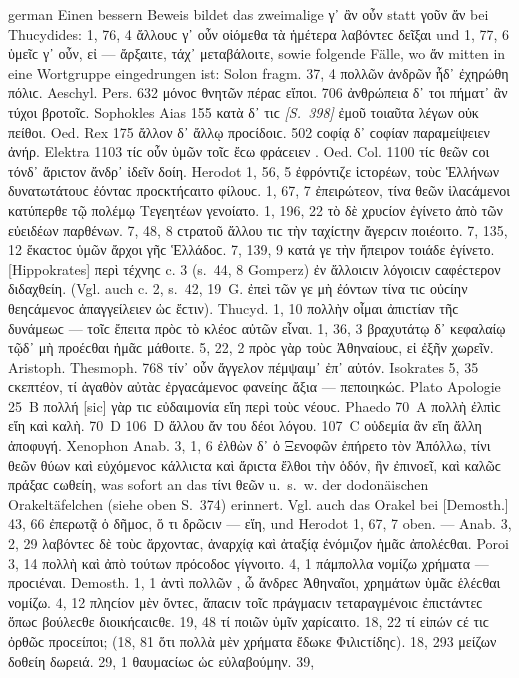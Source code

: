 \begin{otherlanguage*}{german}
Einen bessern Beweis bildet das zweimalige γ᾽ ἂν οὖν statt γοῦν ἄν bei Thucydides: 1, 76, 4 ἄλλουϲ γ᾽  οὖν οἰόμεθα τὰ ἡμέτερα λαβόντεϲ δεῖξαι  und 1, 77, 6 ὑμεῖϲ γ᾽  οὖν, εἰ — ἄρξαιτε, τάχ᾽  μεταβάλοιτε, sowie folgende Fälle, wo ἄν mitten in eine Wortgruppe eingedrungen ist: Solon fragm. 37, 4 πολλῶν  ἀνδρῶν ἧδ᾽ ἐχηρώθη πόλιϲ. Aeschyl. Pers. 632 μόνοϲ  θνητῶν πέραϲ εἴποι. 706 ἀνθρώπεια δ᾽  τοι πήματ᾽ ἂν τύχοι βροτοῖϲ. Sophokles Aias 155 κατὰ δ᾽  τιϲ \hypertarget{p398}{\emph{[S.~398]}}\label{p398} ἐμοῦ τοιαῦτα λέγων οὐκ  πείθοι. Oed. Rex 175 ἄλλον δ᾽  ἄλλῳ προϲίδοιϲ. 502 ϲοφίᾳ δ᾽  ϲοφίαν παραμείψειεν ἀνήρ. Elektra 1103 τίϲ οὖν  ὑμῶν τοῖϲ ἔϲω φράϲειεν . Oed. Col. 1100 τίϲ  θεῶν ϲοι τόνδ᾽ ἄριϲτον ἄνδρ᾽ ἰδεῖν δοίη. Herodot 1, 56, 5 ἐφρόντιζε ἱϲτορέων, τοὺϲ  Ἑλλήνων δυνατωτάτουϲ ἐόνταϲ προϲκτήϲαιτο φίλουϲ. 1, 67, 7 ἐπειρώτεον, τίνα  θεῶν ἱλαϲάμενοι κατύπερθε τῷ πολέμῳ Τεγεητέων γενοίατο. 1, 196, 22 τὸ δὲ  χρυϲίον ἐγίνετο ἀπὸ τῶν εὐειδέων παρθένων. 7, 48, 8 ϲτρατοῦ  ἄλλου τιϲ τὴν ταχίϲτην ἄγερϲιν ποιέοιτο. 7, 135, 12 ἕκαϲτοϲ  ὑμῶν ἄρχοι γῆϲ Ἑλλάδοϲ. 7, 139, 9 κατά γε  τὴν ἤπειρον τοιάδε ἐγίνετο. [Hippokrates] περὶ τέχνηϲ c. 3 (s.~44, 8 Gomperz) ἐν ἄλλοιϲιν  λόγοιϲιν ϲαφέϲτερον διδαχθείη. (Vgl. auch c. 2, s.~42, 19~G. ἐπεὶ τῶν γε μὴ ἐόντων τίνα  τιϲ οὐϲίην θεηϲάμενοϲ ἀπαγγείλειεν ὡϲ ἔϲτιν). Thucyd. 1, 10 πολλὴν  οἶμαι ἀπιϲτίαν τῆϲ δυνάμεωϲ — τοῖϲ ἔπειτα πρὸϲ τὸ κλέοϲ αὐτῶν εἶναι. 1, 36, 3 βραχυτάτῳ δ᾽  κεφαλαίῳ τῷδ᾽  μὴ προέϲθαι ἡμᾶϲ μάθοιτε. 5, 22, 2 πρὸϲ γὰρ  τοὺϲ Ἀθηναίουϲ, εἰ ἐξῆν χωρεῖν. Aristoph. Thesmoph. 768 τίν᾽ οὖν  ἄγγελον πέμψαιμ᾽ ἐπ᾽ αὐτόν. Isokrates 5, 35 ϲκεπτέον, τί  ἀγαθὸν αὐτὰϲ ἐργαϲάμενοϲ φανείηϲ ἄξια — πεποιηκώϲ. Plato Apologie 25~B πολλή [sic] γὰρ  τιϲ εὐδαιμονία εἴη περὶ τοὺϲ νέουϲ. Phaedo 70~Α πολλὴ  ἐλπὶϲ εἴη καὶ καλὴ. 70~D 106~D ἄλλου {ἄν} του δέοι λόγου. 107~C οὐδεμία {ἂν} εἴη ἄλλη ἀποφυγή. Xenophon Anab. 3, 1, 6 ἐλθὼν δ᾽ ὁ Ξενοφῶν ἐπήρετο τὸν Ἀπόλλω, τίνι  θεῶν θύων καὶ εὐχόμενοϲ κάλλιϲτα καὶ ἄριϲτα ἔλθοι τὴν ὁδόν, ἣν ἐπινοεῖ, καὶ καλῶϲ πράξαϲ ϲωθείη, was sofort an das τίνι  θεῶν u.~s.~w. der dodonäischen Orakeltäfelchen (siehe oben S.~374) erinnert. Vgl. auch das Orakel bei [Demosth.] 43, 66 ἐπερωτᾷ ὁ δῆμοϲ, ὅ τι  δρῶϲιν — εἵη, und Herodot 1, 67, 7 oben. — Anab. 3, 2, 29 λαβόντεϲ δὲ τοὺϲ ἄρχονταϲ, ἀναρχίᾳ  καὶ ἀταξίᾳ ἐνόμιζον ἡμᾶϲ ἀπολέϲθαι. Poroi 3, 14 πολλὴ  καὶ ἀπὸ τούτων πρόϲοδοϲ γίγνοιτο. 4, 1 πάμπολλα  νομίζω χρήματα — προϲιέναι. Demosth. 1, 1 ἀντὶ πολλῶν , ὦ ἄνδρεϲ Ἀθηναῖοι, χρημάτων ὑμᾶϲ ἑλέϲθαι νομίζω. 4, 12 πληϲίον μὲν ὄντεϲ, ἅπαϲιν  τοῖϲ πράγμαϲιν τεταραγμένοιϲ ἐπιϲτάντεϲ ὅπωϲ βούλεϲθε διοικήϲαιϲθε. 19, 48 τί  ποιῶν ὑμῖν χαρίϲαιτο. 18, 22 τί  εἰπών ϲέ τιϲ ὀρθῶϲ προϲείποι; (18, 81 ὅτι πολλὰ μὲν  χρήματα ἔδωκε Φιλιϲτίδηϲ). 18, 293 μείζων  δοθείη δωρειά. 29, 1 θαυμαϲίωϲ  ὡϲ εὐλαβούμην. 39, 
\end{otherlanguage*}
